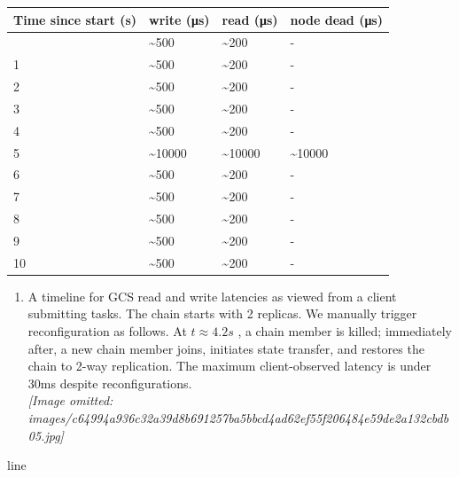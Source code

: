 \documentclass[
]{article}
\newcounter{none} %
\providecommand{\tightlist}{%
  \setlength{\itemsep}{0pt}\setlength{\parskip}{0pt}}
\begin{document}
{\def\LTcaptype{none} %
\begin{longtable}[]{@{}llll@{}}
\toprule\noalign{}
Time since start (s) & write (μs) & read (μs) & node dead (μs) \\
\midrule\noalign{}
\endhead
\bottomrule\noalign{}
\endlastfoot
0 & \textasciitilde500 & \textasciitilde200 & - \\
1 & \textasciitilde500 & \textasciitilde200 & - \\
2 & \textasciitilde500 & \textasciitilde200 & - \\
3 & \textasciitilde500 & \textasciitilde200 & - \\
4 & \textasciitilde500 & \textasciitilde200 & - \\
5 & \textasciitilde10000 & \textasciitilde10000 &
\textasciitilde10000 \\
6 & \textasciitilde500 & \textasciitilde200 & - \\
7 & \textasciitilde500 & \textasciitilde200 & - \\
8 & \textasciitilde500 & \textasciitilde200 & - \\
9 & \textasciitilde500 & \textasciitilde200 & - \\
10 & \textasciitilde500 & \textasciitilde200 & - \\
\end{longtable}
}

\begin{enumerate}
\def\labelenumi{(\alph{enumi})}
\tightlist
\item
  A timeline for GCS read and write latencies as viewed from a client
  submitting tasks. The chain starts with 2 replicas. We manually
  trigger reconfiguration as follows. At \(t \approx 4.2s\) , a chain
  member is killed; immediately after, a new chain member joins,
  initiates state transfer, and restores the chain to 2-way replication.
  The maximum client-observed latency is under 30ms despite
  reconfigurations.\\
  \textit{[Image omitted: images/c64994a936c32a39d8b691257ba5bbcd4ad62ef55f206484e59de2a132cbdb05.jpg]}
\end{enumerate}

line
\end{document}

